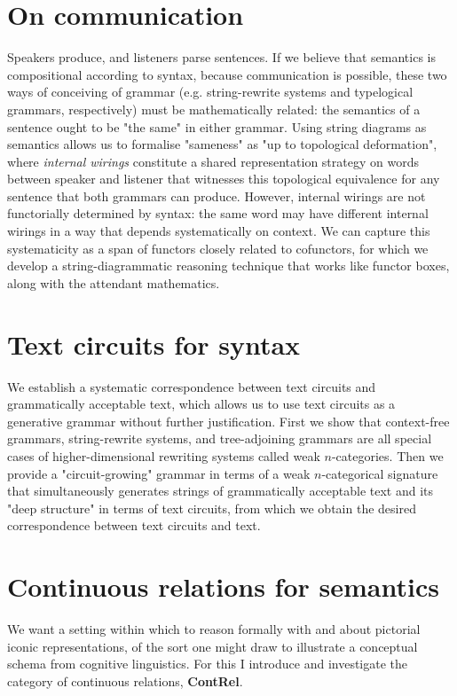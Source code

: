 \chapter{On communication}\label{chapter:internalwirings}
Speakers produce, and listeners parse sentences. If we believe that semantics is compositional according to syntax, because communication is possible, these two ways of conceiving of grammar (e.g. string-rewrite systems and typelogical grammars, respectively) must be mathematically related: the semantics of a sentence ought to be "the same" in either grammar. Using string diagrams as semantics allows us to formalise "sameness" as "up to topological deformation", where \emph{internal wirings} constitute a shared representation strategy on words between speaker and listener that witnesses this topological equivalence for any sentence that both grammars can produce. However, internal wirings are not functorially determined by syntax: the same word may have different internal wirings in a way that depends systematically on context. We can capture this systematicity as a span of functors closely related to cofunctors, for which we develop a string-diagrammatic reasoning technique that works like functor boxes, along with the attendant mathematics.
\clearpage
\newpage


\chapter{Text circuits for syntax}\label{chapter:textcircuits}
We establish a systematic correspondence between text circuits and grammatically acceptable text, which allows us to use text circuits as a generative grammar without further justification. First we show that context-free grammars, string-rewrite systems, and tree-adjoining grammars are all special cases of higher-dimensional rewriting systems called weak $n$-categories. Then we provide a "circuit-growing" grammar in terms of a weak $n$-categorical signature that simultaneously generates strings of grammatically acceptable text and its "deep structure" in terms of text circuits, from which we obtain the desired correspondence between text circuits and text.
\clearpage
\newpage
\label{sec:ncat}
\clearpage
\newpage

\clearpage
\newpage

\clearpage

\chapter{Continuous relations for semantics}\label{chapter:contrel}
We want a setting within which to reason formally with and about pictorial iconic representations, of the sort one might draw to illustrate a conceptual schema from cognitive linguistics. For this I introduce and investigate the category of continuous relations, \textbf{ContRel}.
\clearpage
\newpage

\clearpage
\newpage

\clearpage
\newpage

\clearpage
\newpage


